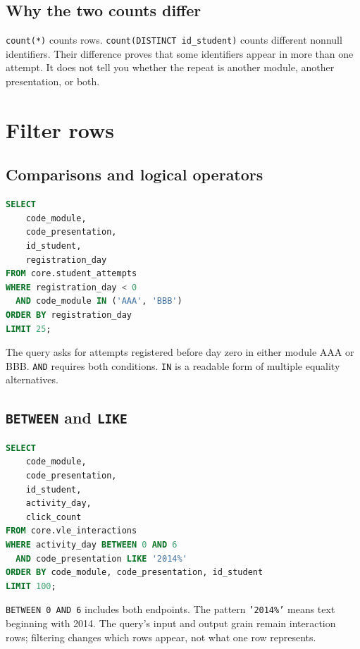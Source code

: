 
\subsection{Why the two counts differ}
\texttt{count(*)} counts rows. \texttt{count(DISTINCT id\_student)} counts
different nonnull identifiers. Their difference proves that some identifiers
appear in more than one attempt. It does not tell you whether the repeat is
another module, another presentation, or both.

\section{Filter rows}

\subsection{Comparisons and logical operators}

\begin{lstlisting}[language=SQL]
SELECT
    code_module,
    code_presentation,
    id_student,
    registration_day
FROM core.student_attempts
WHERE registration_day < 0
  AND code_module IN ('AAA', 'BBB')
ORDER BY registration_day
LIMIT 25;
\end{lstlisting}

The query asks for attempts registered before day zero in either module AAA or
BBB. \texttt{AND} requires both conditions. \texttt{IN} is a readable form of
multiple equality alternatives.

\subsection{\texttt{BETWEEN} and \texttt{LIKE}}

\begin{lstlisting}[language=SQL]
SELECT
    code_module,
    code_presentation,
    id_student,
    activity_day,
    click_count
FROM core.vle_interactions
WHERE activity_day BETWEEN 0 AND 6
  AND code_presentation LIKE '2014%'
ORDER BY code_module, code_presentation, id_student
LIMIT 100;
\end{lstlisting}

\texttt{BETWEEN 0 AND 6} includes both endpoints. The pattern
\texttt{'2014\%'} means text beginning with 2014. The query's input and output
grain remain interaction rows; filtering changes which rows appear, not what
one row represents.

